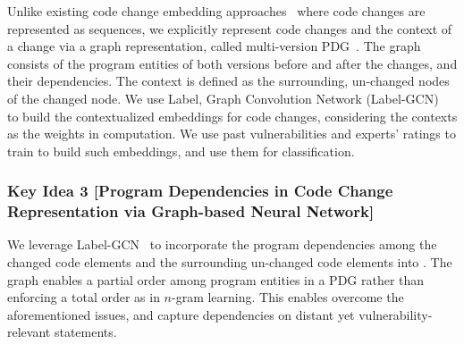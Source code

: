 Unlike existing code change embedding
approaches~\cite{cc2vec,commit2vec} where code changes are represented
as sequences, we explicitly represent code changes and the
context of a change via a graph representation, called multi-version
PDG~\cite{flexeme-fse20}. The graph consists of
the program entities of both versions before and after the changes,
and their dependencies. The context is defined as the surrounding,
un-changed nodes of the changed node.
%
We use Label, Graph Convolution Network (Label-GCN)~\cite{label-gcn}
to build the contextualized embeddings for code changes, considering
the contexts as the weights in computation.
%
We use past vulnerabilities and experts' ratings to train {\tool}
to build such embeddings, and use them for classification.
%





\subsubsection{Key Idea 3 [Program Dependencies in Code Change Representation via Graph-based Neural Network]}
We leverage Label-GCN~\cite{label-gcn} to incorporate the program dependencies among
the changed code elements and the surrounding un-changed code elements into {\tool}.
%
The graph enables a partial order among program entities in a PDG
rather than enforcing a total order as in $n$-gram learning.
%
This enables {\tool} overcome the aforementioned issues, 
and capture
dependencies on distant yet vulnerability-relevant statements.




